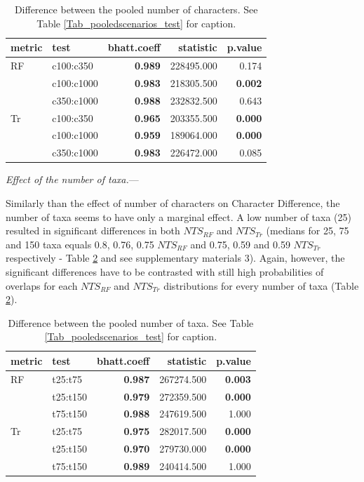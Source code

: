 \documentclass[12pt,letterpaper]{article}
\renewcommand{\subsubsection}[1]{%
\vspace{2ex}
\noindent
\textit{#1.}---}
\begin{document}
\begin{table}[ht]
\centering
\begin{tabular}{ll|r|rr}
  \hline
metric & test & bhatt.coeff & statistic & p.value \\ 
  \hline
RF & c100:c350 & \textbf{0.989} & 228495.000 & 0.174 \\ 
   & c100:c1000 & \textbf{0.983} & 218305.500 & \textbf{0.002} \\ 
   & c350:c1000 & \textbf{0.988} & 232832.500 & 0.643 \\ 
  Tr & c100:c350 & \textbf{0.965} & 203355.500 & \textbf{0.000} \\ 
   & c100:c1000 & \textbf{0.959} & 189064.000 & \textbf{0.000} \\ 
   & c350:c1000 & \textbf{0.983} & 226472.000 & 0.085 \\ 
   \hline
\end{tabular}
\caption{Difference between the pooled number of characters. See Table \ref{Tab_pooledscenarios_test} for caption.} 
\label{Tab_pooledscharacters_test}
\end{table}

\subsubsection{Effect of the number of taxa}

Similarly than the effect of number of characters on Character Difference, the number of taxa seems to have only a marginal effect.
A low number of taxa (25) resulted in significant differences in both $NTS_{RF}$ and $NTS_{Tr}$ (medians for 25, 75 and 150 taxa equals 0.8, 0.76, 0.75 $NTS_{RF}$ and 0.75, 0.59 and 0.59 $NTS_{Tr}$respectively - Table \ref{Tab_pooledstaxa_test} and see supplementary materials 3).
Again, however, the significant differences have to be contrasted with still high probabilities of overlaps for each $NTS_{RF}$ and $NTS_{Tr}$ distributions for every number of taxa (Table \ref{Tab_pooledstaxa_test}).

\begin{table}[ht]
\centering
\begin{tabular}{ll|r|rr}
  \hline
metric & test & bhatt.coeff & statistic & p.value \\ 
  \hline
RF & t25:t75 & \textbf{0.987} & 267274.500 & \textbf{0.003} \\ 
   & t25:t150 &\textbf{0.979} & 272359.500 & \textbf{0.000} \\ 
   & t75:t150 & \textbf{0.988} & 247619.500 & 1.000 \\ 
Tr & t25:t75 & \textbf{0.975} & 282017.500 & \textbf{0.000} \\ 
   & t25:t150 & \textbf{0.970} & 279730.000 & \textbf{0.000} \\ 
   & t75:t150 & \textbf{0.989} & 240414.500 & 1.000 \\ 
   \hline
\end{tabular}
\caption{Difference between the pooled number of taxa. See Table \ref{Tab_pooledscenarios_test} for caption.} 
\label{Tab_pooledstaxa_test}
\end{table}
\end{document}
